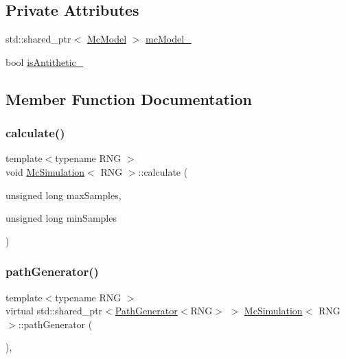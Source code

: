 \subsection*{Private Attributes}
\begin{DoxyCompactItemize}
\item 
std\+::shared\+\_\+ptr$<$ \hyperlink{class_mc_model}{Mc\+Model} $>$ \hyperlink{class_mc_simulation_a5ccf1b2ffc6ec2dd7d7efcf4c6163f62}{mc\+Model\+\_\+}
\item 
bool \hyperlink{class_mc_simulation_a42eb4d165bfdfae218b4508e2321c4a3}{is\+Antithetic\+\_\+}
\end{DoxyCompactItemize}


\subsection{Member Function Documentation}
\hypertarget{class_mc_simulation_acaa09060a9ee90e0cc3631d8b30ebae0}{}\label{class_mc_simulation_acaa09060a9ee90e0cc3631d8b30ebae0} 
\subsubsection{\texorpdfstring{calculate()}{calculate()}}
{\footnotesize\ttfamily template$<$typename R\+NG $>$ \\
void \hyperlink{class_mc_simulation}{Mc\+Simulation}$<$ R\+NG $>$\+::calculate (\begin{DoxyParamCaption}\item[{unsigned long}]{max\+Samples,  }\item[{unsigned long}]{min\+Samples }\end{DoxyParamCaption})}

\hypertarget{class_mc_simulation_a44086a1efd452d8644c9f2e52417038f}{}\label{class_mc_simulation_a44086a1efd452d8644c9f2e52417038f} 
\subsubsection{\texorpdfstring{path\+Generator()}{pathGenerator()}}
{\footnotesize\ttfamily template$<$typename R\+NG $>$ \\
virtual std\+::shared\+\_\+ptr$<$\hyperlink{class_path_generator}{Path\+Generator}$<$R\+NG$>$ $>$ \hyperlink{class_mc_simulation}{Mc\+Simulation}$<$ R\+NG $>$\+::path\+Generator (\begin{DoxyParamCaption}{ }\end{DoxyParamCaption})\hspace{0.3cm}{\ttfamily [private]}, {}}



